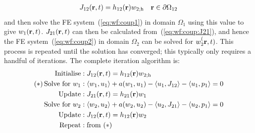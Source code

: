 \documentclass[a4paper]{article}
\numberwithin{equation}{section}
\begin{document}
\begin{align}
\begin{matrix}
J_{12}(\boldsymbol{\mathrm{r}},t) = h_{12}(\boldsymbol{\mathrm{r}}) w_{2;\mathrm{h}} &\boldsymbol{\mathrm{r}}\in\partial\Omega_{12}
\end{matrix}
\end{align}
and then solve the FE system~(\ref{eq:wf:coup1}) in domain $\Omega_1$ using
this value to give $w_1(\boldsymbol{\mathrm{r}},t)$. $J_{21}(\boldsymbol{\mathrm{r}},t)$ can then be calculated from~(\ref{eq:wf:coup:J21}),
and hence the FE system~(\ref{eq:wf:coup2}) in domain $\Omega_2$ 
can be  solved for $w_2^(\boldsymbol{\mathrm{r}},t)$. This process is repeated until the solution has converged; this typically only 
requires a handful of iterations. The complete iteration algorithm is:
\begin{align}
\mathrm{Initialise} &: J_{12}(\boldsymbol{\mathrm{r}},t) = h_{12}(\boldsymbol{\mathrm{r}}) w_{2;\mathrm{h}} \nonumber \\
\mathrm{(\ast)\,Solve\,\,for}\,\,w_1 &: \langle w_1,u_1 \rangle + a(w_1,u_1) - \langle u_1 , J_{12} \rangle - \langle u_1 , p_1 \rangle = 0 \nonumber \\
\mathrm{Update} &: J_{21}(\boldsymbol{\mathrm{r}},t) = h_{21}(\boldsymbol{\mathrm{r}}) w_1 \nonumber \\
\mathrm{Solve\,\,for}\,\,w_2 &: \langle w_2,u_2 \rangle + a(w_2,u_2) - \langle u_2 , J_{21} \rangle - \langle u_2 , p_1 \rangle = 0 \nonumber \\
\mathrm{Update} &: J_{12}(\boldsymbol{\mathrm{r}},t) = h_{12}(\boldsymbol{\mathrm{r}}) w_2 \nonumber \\
\mathrm{Repeat} &: \mathrm{from}\,\,(\ast) \nonumber
\end{align}
\end{document}
